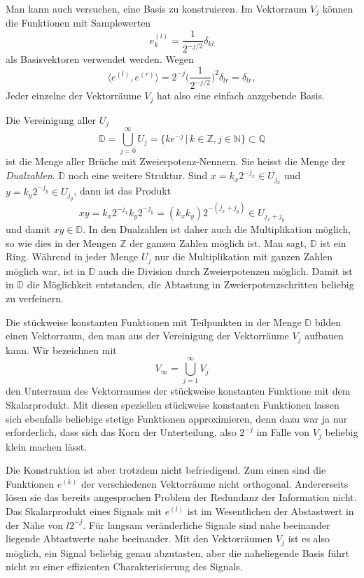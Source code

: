 Man kann auch versuchen, eine Basis zu konstruieren.
Im Vektorraum $V_j$ können die Funktionen mit Samplewerten
\[
e^{(l)}_k = \frac{1}{2^{-j/2}}\delta_{kl}
\]
als Basisvektoren verwendet werden.
Wegen
\[
\langle e^{(l)},e^{(r)}\rangle
=
2^{-j}
\biggl(
\frac{1}{2^{-j/2}}
\biggr)^2\delta_{lr}
=
\delta_{lr},
\]
Jeder einzelne der Vektorräume $V_j$ hat also eine einfach anzgebende
Basis.

Die Vereinigung aller $U_j$ 
\[
\mathbb D
=
\bigcup_{j=0}^\infty U_j
=
\{ ke^{-j}\,|\, k\in\mathbb Z, j\in\mathbb N\}
\subset
\mathbb Q
\]
ist die Menge aller Brüche mit Zweierpotenz-Nennern.
Sie heisst die Menge der {\em Dualzahlen}.
$\mathbb D$ noch eine weitere Struktur.
Sind $x = k_x2^{-j_x}\in U_{j_x}$ und $y=k_y2^{-j_y}\in U_{j_y}$, dann
ist das Produkt
\[
xy = k_x2^{-j_x} k_y2^{-j_y}=(k_xk_y)2^{-(j_x+j_y)}\in U_{j_x+j_y}
\]
und damit $xy\in\mathbb D$.
In den Dualzahlen ist daher auch die Multiplikation möglich, so wie
dies in der Mengen $\mathbb Z$ der ganzen Zahlen möglich ist.
Man sagt, $\mathbb D$ ist ein Ring.
Während in jeder Menge $U_j$ nur die Multiplikation mit ganzen Zahlen
möglich war, ist in $\mathbb D$ auch die Division durch Zweierpotenzen
möglich.
Damit ist in $\mathbb D$ die Möglichkeit entstanden, die Abtastung
in Zweierpotenzschritten beliebig zu verfeinern.

Die stückweise konstanten Funktionen mit Teilpunkten in der Menge
$\mathbb D$ bilden einen Vektorraum, den man aus der Vereinigung
der Vektorräume $V_j$ aufbauen kann.
Wir bezeichnen mit
\[
V_\infty = \bigcup_{j=1}^\infty V_j 
\]
den Unterraum des Vektorraumes der stückweise konstanten Funktione mit
dem Skalarprodukt.
Mit diesen speziellen stückweise konstanten Funktionen lassen sich ebenfalls
beliebige stetige Funktionen approximieren, denn dazu war ja nur 
erforderlich, dass sich das Korn der Unterteilung, also $2^{-j}$ im Falle
von $V_j$ beliebig klein machen lässt.

Die Konstruktion ist aber trotzdem nicht befriedigend.
Zum einen sind die Funktionen $e^{(k)}$ der verschiedenen Vektorräume
nicht orthogonal.
Andererseits lösen sie das bereits angesprochen Problem der Redundanz
der Information nicht.
Das Skalarprodukt eines Signals mit $e^{(l)}$ ist im Wesentlichen der
Abstastwert in der Nähe von $l2^{-j}$.
Für langsam veränderliche Signale sind nahe beeinander liegende 
Abtastwerte nahe beeinander.
Mit den Vektorräumen $V_j$ ist es also möglich, ein Signal beliebig
genau abzutasten, aber die naheliegende Basis führt nicht zu einer
effizienten Charakterisierung des Signals.


